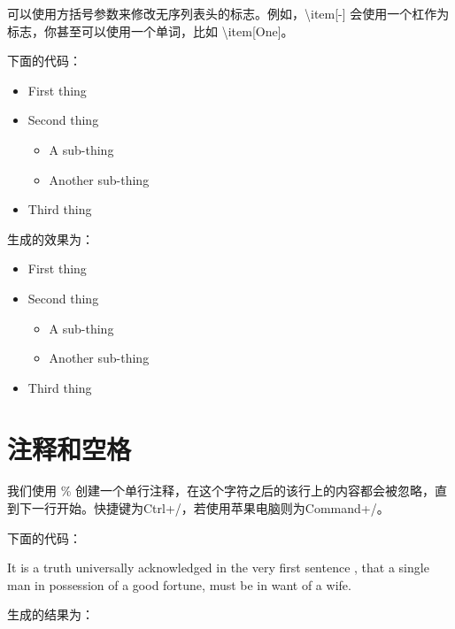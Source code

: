可以使用方括号参数来修改无序列表头的标志。例如，\textbackslash item[-] 会使用一个杠作为标志，你甚至可以使用一个单词，比如 \textbackslash item[One]。

下面的代码：

\begin{python}
\begin{itemize}
	\item[-] First thing

	\item[+] Second thing
	\begin{itemize}
		\item[Fish] A sub-thing

		\item[Plants] Another sub-thing
	\end{itemize}

	\item[Q] Third thing
\end{itemize}
\end{python}


生成的效果为：

\begin{itemize}
	\item[-] First thing

	\item[+] Second thing
	\begin{itemize}
		\item[Fish] A sub-thing

		\item[Plants] Another sub-thing
	\end{itemize}

	\item[Q] Third thing
\end{itemize}

\section{注释和空格}

我们使用 \% 创建一个单行注释，在这个字符之后的该行上的内容都会被忽略，直到下一行开始。快捷键为Ctrl+/，若使用苹果电脑则为Command+/。

下面的代码：

\begin{python}
It is a truth universally acknowledged %
in the very first sentence ,
that a single man in possession of a good fortune,
must be in want of a wife.
\end{python}

生成的结果为：

